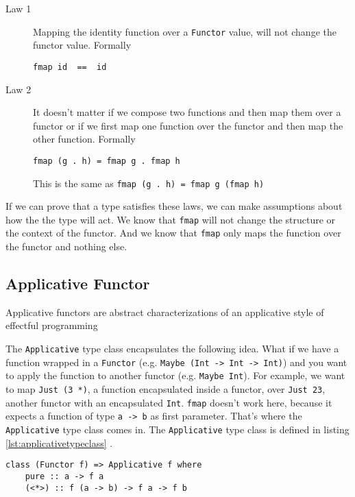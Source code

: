 \begin{description}
\item[Law 1] Mapping the identity function over a \verb|Functor| value, will not change the functor value. Formally
\begin{verbatim}
fmap id  ==  id
\end{verbatim}
\item[Law 2] It doesn't matter if we compose two functions and then map them over a functor or if we first map one function over the functor and then map the other function. Formally
\begin{verbatim}
fmap (g . h) = fmap g . fmap h
\end{verbatim}
This is the same as \verb|fmap (g . h) = fmap g (fmap h)|
\end{description}

If we can prove that a type satisfies these laws, we can make assumptions about how the the type will act. We know that \verb|fmap| will not change the structure or the context of the functor.
And we know that \verb|fmap| only maps the function over the functor and nothing else. 

\subsection{Applicative Functor}
\label{sec:applicatives}

Applicative functors are abstract characterizations of an applicative style of effectful programming \cite{mcbride} \cite{control.applicative}

The \verb|Applicative| type class encapsulates the following idea. What if we have a function wrapped in a \verb|Functor| (e.g. \verb|Maybe (Int -> Int -> Int)|) and you want to apply the function to another functor (e.g. \verb|Maybe Int|). For example, we want to map \verb|Just (3 *)|, a function encapsulated inside a functor, over \verb|Just 23|, another functor with an encapsulated \verb|Int|. \verb|fmap| doesn't work here, because it expects a function of type \verb|a -> b| as first parameter. That's where the \verb|Applicative| type class comes in. 
The \verb|Applicative| type class is defined in listing \ref{lst:applicativetypeclass} \cite{control.applicative}.
\begin{lstlisting}[caption={Declaration of {\ttfamily Applicative} type class},label={lst:applicativetypeclass}]
class (Functor f) => Applicative f where
    pure :: a -> f a
    (<*>) :: f (a -> b) -> f a -> f b
\end{lstlisting}

